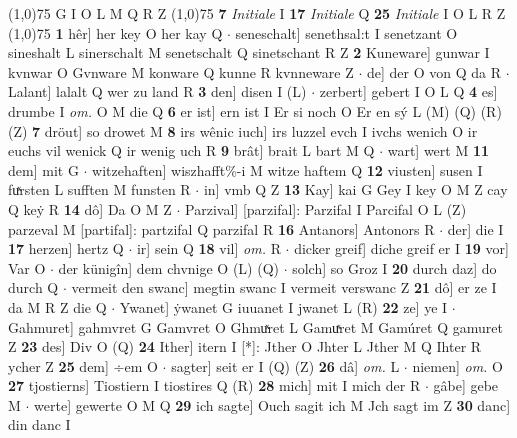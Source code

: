 \documentclass[8pt,a4paper,notitlepage]{article}
\begin{document}
\begin{table}[ht]
\begin{minipage}[t]{0.5\linewidth}
\begin{tabular}{rl}
\end{tabular}
\scriptsize
\line(1,0){75} \newline
G I O L M Q R Z \newline
\line(1,0){75} \newline
\textbf{7} \textit{Initiale} I  \textbf{17} \textit{Initiale} Q  \textbf{25} \textit{Initiale} I O L R Z  \newline
\line(1,0){75} \newline
\textbf{1} hêr] her key O her kay Q  $\cdot$ seneschalt] senethsal:t I senetzant O sineshalt L sinerschalt M senetschalt Q sinetschant R Z \textbf{2} Kuneware] gunwar I kvnwar O Gvnware M konware Q kunne R kvnneware Z  $\cdot$ de] der O von Q da R  $\cdot$ Lalant] lalalt Q wer zu land R \textbf{3} den] disen I (L)  $\cdot$ zerbert] gebert I O L Q \textbf{4} es] drumbe I \textit{om.} O M die Q \textbf{6} er ist] ern ist I Er si noch O Er en sý L (M) (Q) (R) (Z) \textbf{7} dröut] so drowet M \textbf{8} irs wênic iuch] irs luzzel evch I ivchs wenich O ir euchs vil wenick Q ir wenig uch R \textbf{9} brât] brait L bart M Q  $\cdot$ wart] wert M \textbf{11} dem] mit G  $\cdot$ witzehaften] wiszhafft\%-i M witze haftem Q \textbf{12} viusten] susen I fuͯrsten L sufften M funsten R  $\cdot$ in] vmb Q Z \textbf{13} Kay] kai G Gey I key O M Z cay Q keẏ R \textbf{14} dô] Da O M Z  $\cdot$ Parzival] [parzifal]: Parzifal I Parcifal O L (Z) parzeval M [partifal]: partzifal Q parzifal R \textbf{16} Antanors] Antonors R  $\cdot$ der] die I \textbf{17} herzen] hertz Q  $\cdot$ ir] sein Q \textbf{18} vil] \textit{om.} R  $\cdot$ dicker greif] diche greif er I \textbf{19} vor] Var O  $\cdot$ der künigîn] dem chvnige O (L) (Q)  $\cdot$ solch] so Groz I \textbf{20} durch daz] do durch Q  $\cdot$ vermeit den swanc] megtin swanc I vermeit verswanc Z \textbf{21} dô] er ze I da M R Z die Q  $\cdot$ Ywanet] ẏwanet G iuuanet I jwanet L (R) \textbf{22} ze] ye I  $\cdot$ Gahmuret] gahmvret G Gamvret O Ghmuͯret L Gamuͯret M Gamúret Q gamuret Z \textbf{23} des] Div O (Q) \textbf{24} Ither] itern I [*]: Jther O Jhter L Jther M Q Ihter R ycher Z \textbf{25} dem] ÷em O  $\cdot$ sagter] seit er I (Q) (Z) \textbf{26} dâ] \textit{om.} L  $\cdot$ niemen] \textit{om.} O \textbf{27} tjostierns] Tiostiern I tiostires Q (R) \textbf{28} mich] mit I mich der R  $\cdot$ gâbe] gebe M  $\cdot$ werte] gewerte O M Q \textbf{29} ich sagte] Ouch sagit ich M Jch sagt im Z \textbf{30} danc] din danc I \newline
\end{minipage}
\hspace{0.5cm}

\end{table}
\end{document}
